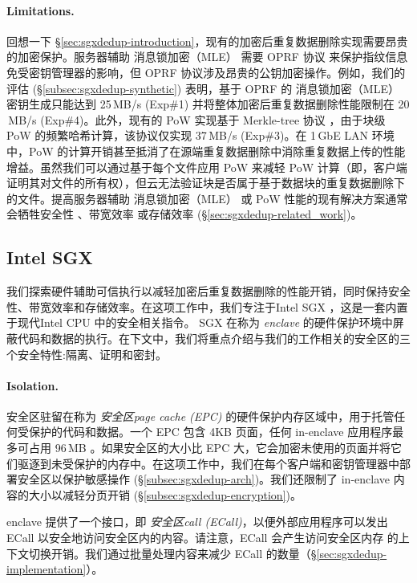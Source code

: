 \paragraph*{Limitations.} 回想一下 \S\ref{sec:sgxdedup-introduction}，现有的加密后重复数据删除实现需要昂贵的加密保护。服务器辅助 消息锁加密（MLE） 需要 OPRF 协议 \cite{naor04} 来保护指纹信息免受密钥管理器的影响，但 OPRF 协议涉及昂贵的公钥加密操作。例如，我们的评估 (\S\ref{subsec:sgxdedup-synthetic}) 表明，基于 OPRF 的 消息锁加密（MLE） 密钥生成只能达到 25\,MB/s (Exp\#1) 并将整体加密后重复数据删除性能限制在 20 \,MB/s (Exp\#4)。此外，现有的 PoW 实现基于 Merkle-tree 协议 \cite{halevi11}，由于块级 PoW 的频繁哈希计算，该协议仅实现 37\,MB/s (Exp\#3)。在 1\,GbE LAN 环境中，PoW 的计算开销甚至抵消了在源端重复数据删除中消除重复数据上传的性能增益。虽然我们可以通过基于每个文件应用 PoW 来减轻 PoW 计算（即，客户端证明其对文件的所有权），但云无法验证块是否属于基于数据块的重复数据删除下的文件。提高服务器辅助 消息锁加密（MLE） 或 PoW 性能的现有解决方案通常会牺牲安全性 \cite{li20b,xu2013weak,pietro12}、带宽效率 \cite{harnik10,li15} 或存储效率 \cite{zhou2015secdep,qin17,li20b} (\S\ref{sec:sgxdedup-related_work})。

\subsection{Intel SGX}
\label{subsec:sgxdedup-sgx} 

我们探索硬件辅助可信执行以减轻加密后重复数据删除的性能开销，同时保持安全性、带宽效率和存储效率。在这项工作中，我们专注于Intel SGX \cite{sgx}，这是一套内置于现代Intel CPU 中的安全相关指令。 SGX 在称为 \textit{ enclave} 的硬件保护环境中屏蔽代码和数据的执行。在下文中，我们将重点介绍与我们的工作相关的安全区的三个安全特性:隔离、证明和密封。

\paragraph*{Isolation.}安全区驻留在称为 \textit{安全区page cache (EPC)} 的硬件保护内存区域中，用于托管任何受保护的代码和数据。一个 EPC 包含 4KB 页面，任何 in-enclave 应用程序最多可占用 96\,MB \cite{harnik18}。如果安全区的大小比 EPC 大，它会加密未使用的页面并将它们驱逐到未受保护的内存中。在这项工作中，我们在每个客户端和密钥管理器中部署安全区以保护敏感操作 (\S\ref{subsec:sgxdedup-arch})。我们还限制了 in-enclave 内容的大小以减轻分页开销 (\S\ref{subsec:sgxdedup-encryption})。

enclave 提供了一个接口，即 \textit{安全区call (ECall)}，以便外部应用程序可以发出 ECall 以安全地访问安全区内的内容。请注意，ECall 会产生访问安全区内存 \cite{harnik18} 的上下文切换开销。我们通过批量处理内容来减少 ECall 的数量（\S\ref{sec:sgxdedup-implementation}）。

